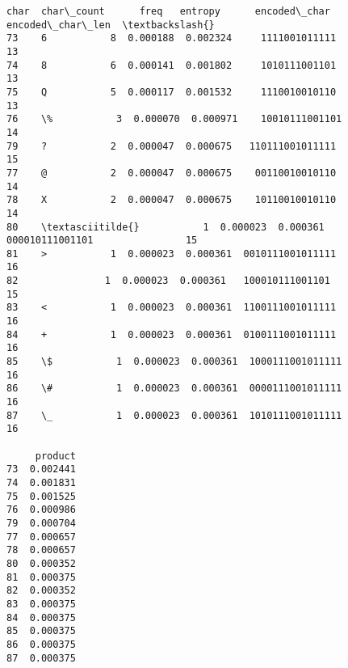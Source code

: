 \documentclass[11pt]{article}
\makeatletter
\newcommand{\boxspacing}{\kern\kvtcb@left@rule\kern\kvtcb@boxsep}
\newcommand{\prompt}[4]{
        \ttfamily\llap{{\color{#2}[#3]:\hspace{3pt}#4}}\vspace{-\baselineskip}
    }
\makeatother
\begin{document}
            \begin{tcolorbox}[breakable, size=fbox, boxrule=.5pt, pad at break*=1mm, opacityfill=0]
\prompt{Out}{outcolor}{14}{\boxspacing}
\begin{Verbatim}[commandchars=\\\{\}]
   char  char\_count      freq   entropy      encoded\_char  encoded\_char\_len  \textbackslash{}
73    6           8  0.000188  0.002324     1111001011111                13
74    8           6  0.000141  0.001802     1010111001101                13
75    Q           5  0.000117  0.001532     1110010010110                13
76    \%           3  0.000070  0.000971    10010111001101                14
79    ?           2  0.000047  0.000675   110111001011111                15
77    @           2  0.000047  0.000675    00110010010110                14
78    X           2  0.000047  0.000675    10110010010110                14
80    \textasciitilde{}           1  0.000023  0.000361   000010111001101                15
81    >           1  0.000023  0.000361  0010111001011111                16
82    ﻿           1  0.000023  0.000361   100010111001101                15
83    <           1  0.000023  0.000361  1100111001011111                16
84    +           1  0.000023  0.000361  0100111001011111                16
85    \$           1  0.000023  0.000361  1000111001011111                16
86    \#           1  0.000023  0.000361  0000111001011111                16
87    \_           1  0.000023  0.000361  1010111001011111                16

     product
73  0.002441
74  0.001831
75  0.001525
76  0.000986
79  0.000704
77  0.000657
78  0.000657
80  0.000352
81  0.000375
82  0.000352
83  0.000375
84  0.000375
85  0.000375
86  0.000375
87  0.000375
\end{Verbatim}
\end{tcolorbox}
        
\end{document}
